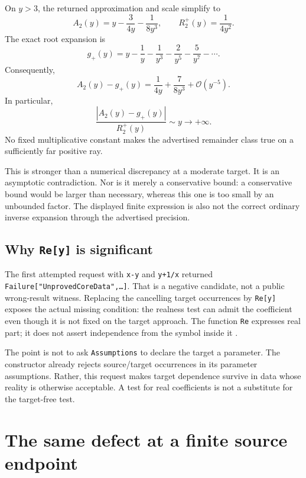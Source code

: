 \documentclass[11pt,letterpaper]{article}
\theoremstyle{remark}\newtheorem{remark}[theorem]{Remark}
\newcommand{\code}[1]{\texttt{#1}}
\newcommand{\OO}[1]{\mathcal O\!\left(#1\right)}
\begin{document}
On $y>3$, the returned approximation and scale simplify to
\begin{equation}\label{eq:largeobserved}
 A_2(y)=y-\frac{3}{4y}-\frac{1}{8y^3},\qquad
 R_2^+(y)=\frac1{4y^2}.
\end{equation}
The exact root expansion is
\begin{equation}\label{eq:catalanroot}
 g_+(y)=y-\frac1y-\frac1{y^3}-\frac2{y^5}-\frac5{y^7}-\cdots.
\end{equation}
Consequently,
\begin{equation}\label{eq:largeerror}
 A_2(y)-g_+(y)=\frac1{4y}+\frac7{8y^3}+\OO{y^{-5}}.
\end{equation}
In particular,
\begin{equation}\label{eq:largeratio}
 \frac{|A_2(y)-g_+(y)|}{R_2^+(y)}\sim y\longrightarrow+\infty.
\end{equation}
No fixed multiplicative constant makes the advertised remainder class true
on a sufficiently far positive ray.

This is stronger than a numerical discrepancy at a moderate target. It is an
asymptotic contradiction. Nor is it merely a conservative bound: a conservative
bound would be larger than necessary, whereas this one is too small by an
unbounded factor. The displayed finite expression is also not the correct
ordinary inverse expansion through the advertised precision.

\subsection{Why \code{Re[y]} is significant}
The first attempted request with \code{x-y} and \code{y+1/x} returned
\code{Failure["UnprovedCoreData",\ldots]}. That is a negative candidate, not a
public wrong-result witness. Replacing the cancelling target occurrences by
\code{Re[y]} exposes the actual missing condition: the realness test can admit
the coefficient even though it is not fixed on the target approach.
The function \code{Re} expresses real part; it does not assert independence
from the symbol inside it \cite{re}.

The point is not to ask \code{Assumptions} to declare the target a parameter.
The constructor already rejects source/target occurrences in its parameter
assumptions. Rather, this request makes target dependence survive in data
whose reality is otherwise acceptable. A test for real coefficients is not a
substitute for the target-free test.

\section{The same defect at a finite source endpoint}
\end{document}

